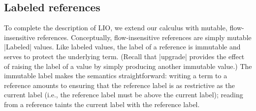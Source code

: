 \subsection{Labeled references}

To complete the description of LIO, we extend our \lio{} calculus  with
mutable, flow-insensitive references.
%
Conceptually, flow-insensitive references are simply mutable |Labeled| values.
%
Like labeled values, the label of a reference is immutable and serves to
protect the underlying term.
%
(Recall that |upgrade| provides the effect of raising the label of a value by simply
producing another immutable value.)
%
The immutable label makes the semantics straightforward: writing a term to a
reference amounts to ensuring that the reference label is as restrictive as the current
label (i.e., the reference label must be above the current label);
reading from a reference taints the current label with the reference label.
%

